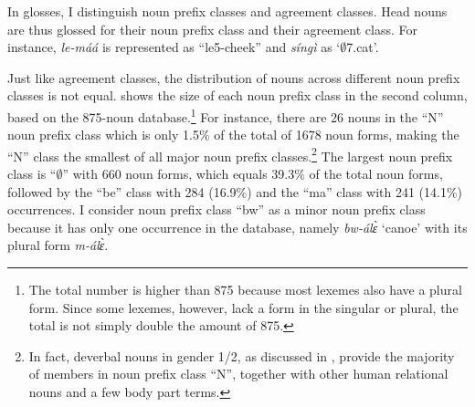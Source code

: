 In glosses, I distinguish noun prefix classes and agreement classes. Head nouns are thus glossed for their noun prefix class and their agreement class. For instance, {\itshape le-máá} is represented as ``le5-cheek'' and {\itshape síngì} as `$\emptyset$7.cat'. 

Just like agreement classes, the distribution of nouns across different noun prefix classes is not equal.   shows the size of each noun prefix class in the second column, based on the 875-noun database.\footnote{The total number is higher than 875 because most lexemes also have a plural form. Since some lexemes, however, lack a form in the singular or plural, the total is not simply double the amount of 875.} For instance, there are 26 nouns in the ``N'' noun prefix class which is only 1.5\% of the total of 1678 noun forms, making the ``N'' class the smallest of all major noun prefix classes.\footnote{In fact, deverbal nouns in gender 1/2, as discussed in , provide the majority of members in noun prefix class ``N'', together with other human relational nouns and a few body part terms.} The largest noun prefix class is ``$\emptyset$'' with 660 noun forms, which equals 39.3\% of the total noun forms, followed by the ``be'' class with 284 (16.9\%) and the ``ma'' class with 241 (14.1\%) occurrences. I consider noun prefix class ``bw'' as a minor noun prefix class because it has only one occurrence in the database, namely {\itshape bw-álɛ̀} `canoe' with its plural form {\itshape m-álɛ̀}.

